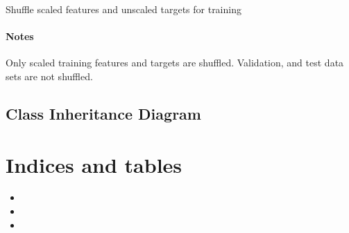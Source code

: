 \documentclass[a4paper,10pt,english]{sphinxmanual}
\begin{document}
\begin{fulllineitems}
\begin{fulllineitems}
\end{fulllineitems}


\begin{fulllineitems}
\label{\detokenize{api/ucf.TrainingDataSets:ucf.TrainingDataSets.shuffle}}
Shuffle scaled features and unscaled targets for training
\subsubsection*{Notes}

Only scaled training features and targets are shuffled. Validation,
and test data sets are not shuffled.

\end{fulllineitems}


\end{fulllineitems}



\section{Class Inheritance Diagram}
\label{\detokenize{index:class-inheritance-diagram}}


\chapter{Indices and tables}
\label{\detokenize{index:indices-and-tables}}\begin{itemize}
\item {} 

\item {} 

\item {} 

\end{itemize}


\renewcommand{\indexname}{Python Module Index}
\begin{sphinxtheindex}
\let\bigletter\sphinxstyleindexlettergroup
\bigletter{u}
\item\relax{}
\end{sphinxtheindex}

\renewcommand{\indexname}{Index}
\printindex
\end{document}
